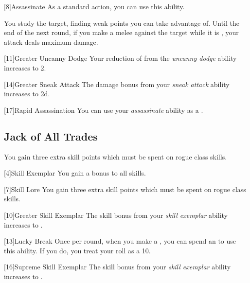         [8]{Assassinate} As a standard action, you can use this ability.
        \begin{ability}
            \begin{spelltargetinginfo}
            \end{spelltargetinginfo}
            \begin{spelleffects}
                \spelleffect You study the target, finding weak points you can take advantage of.
                Until the end of the next round, if you make a melee  against the target while it is \unaware, your attack deals maximum damage.
            \end{spelleffects}
        \end{ability}

        [11]{Greater Uncanny Dodge}
        Your reduction of  from the \textit{uncanny dodge} ability increases to 2.

        [14]{Greater Sneak Attack}
        The damage bonus from your \textit{sneak attack} ability increases to \plus2d.

        [17]{Rapid Assassination} You can use your \textit{assassinate} ability as a .

    \subsection{Jack of All Trades}

         You gain three extra skill points which must be spent on rogue class skills.

        [4]{Skill Exemplar} You gain a  bonus to all skills.

        [7]{Skill Lore} You gain three extra skill points which must be spent on rogue class skills.

        [10]{Greater Skill Exemplar} The skill bonus from your \textit{skill exemplar} ability increases to .

        [13]{Lucky Break} Once per round, when you make a , you can spend an  to use this ability.
        If you do, you treat your roll as a 10.

        [16]{Supreme Skill Exemplar} The skill bonus from your \textit{skill exemplar} ability increases to .

